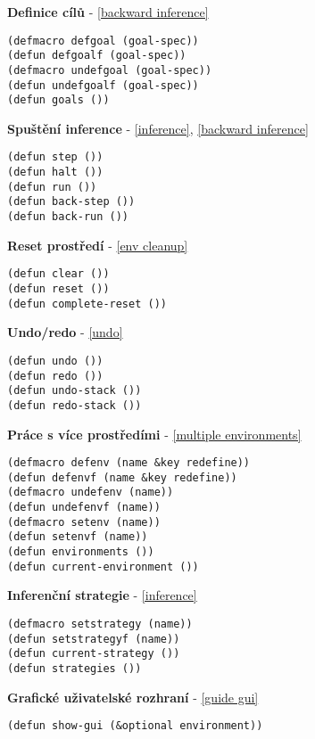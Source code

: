 \textbf{Definice cílů} - \ref{backward inference}
\begin{verbatim}
(defmacro defgoal (goal-spec))
(defun defgoalf (goal-spec))
(defmacro undefgoal (goal-spec))
(defun undefgoalf (goal-spec))
(defun goals ())
\end{verbatim}

\textbf{Spuštění inference} - \ref{inference}, \ref{backward inference}
\begin{verbatim}
(defun step ())
(defun halt ())
(defun run ())
(defun back-step ())
(defun back-run ())
\end{verbatim}

\textbf{Reset prostředí} - \ref{env cleanup}
\begin{verbatim}
(defun clear ())
(defun reset ())
(defun complete-reset ())
\end{verbatim}

\textbf{Undo/redo} - \ref{undo}
\begin{verbatim}
(defun undo ())
(defun redo ())
(defun undo-stack ())
(defun redo-stack ())
\end{verbatim}

\textbf{Práce s více prostředími} - \ref{multiple environments}
\begin{verbatim}
(defmacro defenv (name &key redefine))
(defun defenvf (name &key redefine))
(defmacro undefenv (name))
(defun undefenvf (name))
(defmacro setenv (name))
(defun setenvf (name))
(defun environments ())
(defun current-environment ())
\end{verbatim}

\textbf{Inferenční strategie} - \ref{inference}
\begin{verbatim}
(defmacro setstrategy (name))
(defun setstrategyf (name))
(defun current-strategy ())
(defun strategies ())
\end{verbatim}

\textbf{Grafické uživatelské rozhraní} - \ref{guide gui}
\begin{verbatim}
(defun show-gui (&optional environment))
\end{verbatim}
